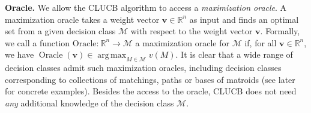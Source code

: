 \documentclass{article}
\newcommand{\Algorithm}{{\small \textsf{CLUCB}}\xspace}
\newcommand{\M}{\mathcal M}
\newcommand{\RR}{\mathbb R}
\DeclareMathOperator*{\argmax}{arg\,max}
\DeclareMathOperator{\Oracle}{Oracle}
\renewcommand{\vec}[1]{\boldsymbol{#1}}
\begin{document}
\textbf{Oracle.}
We allow the \Algorithm algorithm to access a \emph{maximization oracle}. 
A maximization oracle takes a weight vector $\vec v \in \RR^{n}$ as input and finds an optimal set from a given decision class $\M$ with respect to the weight vector $\vec v$.
Formally, we call a function $\text{Oracle:}~\RR^{n} \rightarrow \M$ a maximization oracle for $\M$ if, for all $\vec v\in \RR^{n}$, we have $\Oracle(\vec v) \in \argmax_{M\in \M} v(M)$.
It is clear that a wide range of decision classes admit such maximization oracles, including decision classes corresponding to collections of matchings, paths or bases of matroids (see later for concrete examples).
Besides the access to the oracle, \Algorithm does not need \emph{any} additional knowledge of the decision class $\M$.

\end{document}
